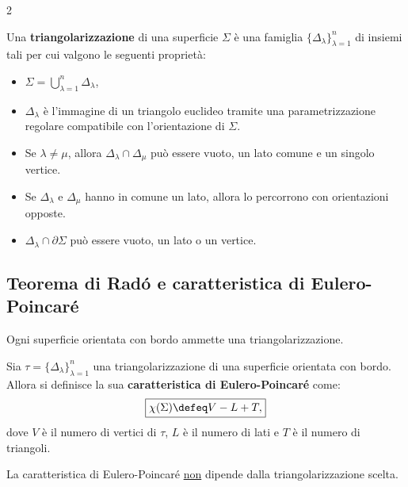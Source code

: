 \begin{multicols*}{2}
    \begin{definition}[Triangolarizzazione]
        Una \textbf{triangolarizzazione} di una superficie $\Sigma$ è una famiglia
        $\{ \Delta_\lambda \}_{\lambda=1}^n$ di insiemi tali per cui valgono
        le seguenti proprietà:
        \begin{itemize}
            \item $\Sigma = \bigcup_{\lambda=1}^n \Delta_\lambda$,
            \item $\Delta_\lambda$ è l'immagine di un triangolo euclideo tramite una
                  parametrizzazione regolare compatibile con l'orientazione
                  di $\Sigma$.
            \item Se $\lambda \neq \mu$, allora $\Delta_\lambda \cap \Delta_\mu$ può essere
                  vuoto, un lato comune e un singolo vertice.
            \item Se $\Delta_\lambda$ e $\Delta_\mu$ hanno in comune un lato, allora lo percorrono con
                  orientazioni opposte.
            \item $\Delta_\lambda \cap \partial \Sigma$ può essere vuoto, un lato o un vertice.
        \end{itemize}
    \end{definition}

    \subsection{Teorema di Radó e caratteristica di Eulero-Poincaré}

    \begin{theorem}[Radó] \label{thm:rado}
        Ogni superficie orientata con bordo ammette una triangolarizzazione.
    \end{theorem}

    \begin{definition}
        Sia $\tau = \{ \Delta_\lambda \}_{\lambda=1}^n$ una triangolarizzazione di
        una superficie orientata con bordo. Allora si definisce la sua
        \textbf{caratteristica di Eulero-Poincaré} come:
        \[
            \boxed{\chi(\Sigma) \defeq V - L + T,}
        \]
        dove $V$ è il numero di vertici di $\tau$, $L$ è il numero di lati e
        $T$ è il numero di triangoli.
    \end{definition}

    \begin{fact}
        La caratteristica di Eulero-Poincaré \underline{non} dipende dalla
        triangolarizzazione scelta.
    \end{fact}


\end{multicols*}
